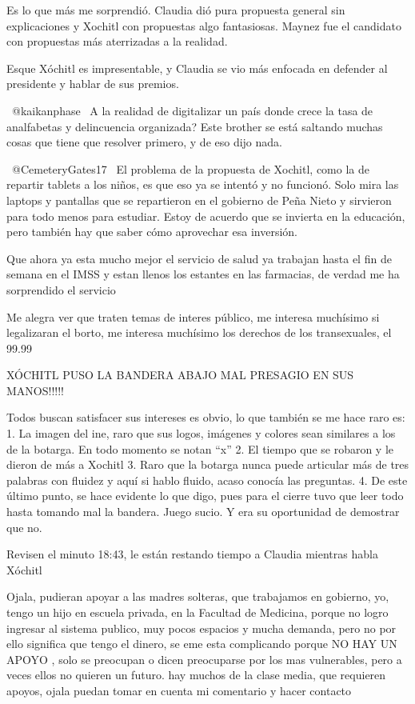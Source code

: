 Es lo que más me sorprendió. Claudia dió pura propuesta general sin explicaciones y Xochitl con propuestas algo fantasiosas.
Maynez fue el candidato con propuestas más aterrizadas a la realidad.

Esque Xóchitl es impresentable, y Claudia se vio más enfocada en defender al presidente y hablar de sus premios.

 @kaikanphase  A la realidad de digitalizar un país donde crece la tasa de analfabetas y delincuencia organizada? Este brother se está saltando muchas cosas que tiene que resolver primero, y de eso dijo nada.

 @CemeteryGates17  El problema de la propuesta de Xochitl, como la de repartir tablets a los niños, es que eso ya se intentó y no funcionó. Solo mira las laptops y pantallas que se repartieron en el gobierno de Peña Nieto y sirvieron para todo menos para estudiar. Estoy de acuerdo que se invierta en la educación, pero también hay que saber cómo aprovechar esa inversión.

Que ahora ya esta mucho mejor el servicio de salud ya trabajan hasta el fin de semana en el IMSS y estan llenos los estantes en las farmacias,  de verdad me ha sorprendido el servicio

Me alegra ver que traten temas de interes público, me interesa muchísimo si legalizaran el borto, me interesa muchísimo los derechos de los transexuales, el 99.99%

XÓCHITL PUSO LA BANDERA ABAJO MAL PRESAGIO EN SUS MANOS!!!!!

Todos buscan satisfacer sus intereses es obvio, lo que también se me hace raro es: 
1. La imagen del ine, raro que sus logos, imágenes y colores sean similares a los de la botarga. En todo momento se notan “x” 
2. El tiempo que se robaron y le dieron de más a Xochitl 
3. Raro que la botarga nunca puede articular más de tres palabras con fluidez y aquí si hablo fluido, acaso conocía las preguntas. 
4. De este último punto, se hace evidente lo que digo, pues para el cierre tuvo que leer todo hasta tomando mal la bandera. 
Juego sucio. Y era su oportunidad de demostrar que no.

Revisen el minuto 18:43, le están restando tiempo a Claudia mientras habla Xóchitl

Ojala, pudieran apoyar a las madres solteras, que trabajamos en gobierno, yo, tengo un hijo en escuela privada, en la Facultad de Medicina, porque no logro ingresar al sistema publico, muy pocos espacios y mucha demanda, pero no  por ello significa que tengo el dinero, se eme esta complicando porque NO HAY UN APOYO , solo se preocupan o dicen preocuparse por los mas vulnerables, pero a veces ellos no quieren un futuro. hay muchos de la clase media, que requieren apoyos, ojala puedan tomar en cuenta mi comentario y hacer contacto


